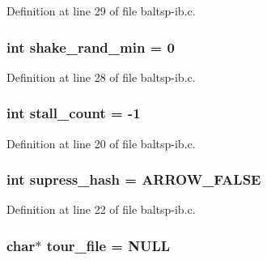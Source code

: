 Definition at line 29 of file baltsp-ib.c.\hypertarget{bin_2baltsp-ib_8c_b7fc57ece1162e77f74b4803961b72cb}{
\subsubsection[{shake\_\-rand\_\-min}]{\setlength{\rightskip}{0pt plus 5cm}int {\bf shake\_\-rand\_\-min} = 0}}
\label{bin_2baltsp-ib_8c_b7fc57ece1162e77f74b4803961b72cb}




Definition at line 28 of file baltsp-ib.c.\hypertarget{bin_2baltsp-ib_8c_a1641a28cf3ea572a56763e84518c17b}{
\subsubsection[{stall\_\-count}]{\setlength{\rightskip}{0pt plus 5cm}int {\bf stall\_\-count} = -1}}
\label{bin_2baltsp-ib_8c_a1641a28cf3ea572a56763e84518c17b}




Definition at line 20 of file baltsp-ib.c.\hypertarget{bin_2baltsp-ib_8c_c022145e682345ed4064bad274e5a4f1}{
\subsubsection[{supress\_\-hash}]{\setlength{\rightskip}{0pt plus 5cm}int {\bf supress\_\-hash} = ARROW\_\-FALSE}}
\label{bin_2baltsp-ib_8c_c022145e682345ed4064bad274e5a4f1}




Definition at line 22 of file baltsp-ib.c.\hypertarget{bin_2baltsp-ib_8c_b818a82f867be75d7c4d92d792b0943e}{
\subsubsection[{tour\_\-file}]{\setlength{\rightskip}{0pt plus 5cm}char$\ast$ {\bf tour\_\-file} = NULL}}
\label{bin_2baltsp-ib_8c_b818a82f867be75d7c4d92d792b0943e}




